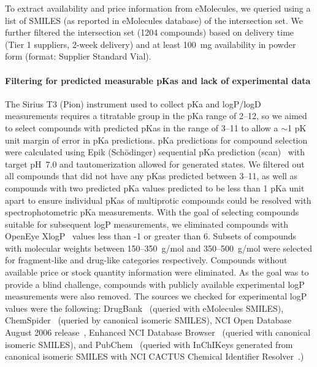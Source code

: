 \documentclass[9pt,lineno]{elife}
\begin{document}
To extract availability and price information from eMolecules, we queried using a list of SMILES (as reported in eMolecules database) of the intersection set. 
We further filtered the intersection set (1204 compounds) based on delivery time (Tier 1 suppliers, 2-week delivery) and at least 100~mg availability in powder form (format: Supplier Standard Vial). 

\paragraph{Filtering for predicted measurable pKas and lack of experimental data}

The Sirius T3 (Pion) instrument used to collect pKa and logP/logD measurements requires a titratable group in the pKa range of 2--12, so we aimed to select compounds with predicted pKas in the range of 3--11 to allow a $\sim$1 pK unit margin of error in pKa predictions. 
pKa predictions for compound selection were calculated using Epik (Sch\"{o}dinger) sequential pKa prediction (scan)~\citep{shelley_epik:_2007,schrodinger_epik_v3_8} with target pH~7.0 and tautomerization allowed for generated states. 
We filtered out all compounds that did not have any pKas predicted between 3--11, as well as compounds with two predicted pKa values predicted to be less than 1 pKa unit apart to ensure individual pKas of multiprotic compounds could be resolved with spectrophotometric pKa measurements. 
With the goal of selecting compounds suitable for subsequent logP measurements, we eliminated compounds with OpenEye XlogP~\citep{oemolprop_openeye_2017} values less than -1 or greater than 6. 
Subsets of compounds with molecular weights between 150--350~g/mol and 350--500~g/mol were selected for fragment-like and drug-like categories respectively. 
Compounds without available price or stock quantity information were eliminated. 
As the goal was to provide a blind challenge, compounds with publicly available experimental logP measurements were also removed. 
The sources we checked for experimental logP values were the following: DrugBank~\citep{wishart_drugbank:_2006} (queried with eMolecules SMILES), ChemSpider~\citep{pence_chemspider:_2010} (queried by canonical isomeric SMILES), NCI Open Database August 2006 release~\citep{nci_open_database_2006}, Enhanced NCI Database Browser~\citep{nci_database_browser} (queried with canonical isomeric SMILES), and PubChem~\citep{kim_pubchem_2016} (queried with InChIKeys generated from canonical isomeric SMILES with NCI CACTUS Chemical Identifier Resolver~\citep{nci_chem_id_resolver}.)
\end{document}
